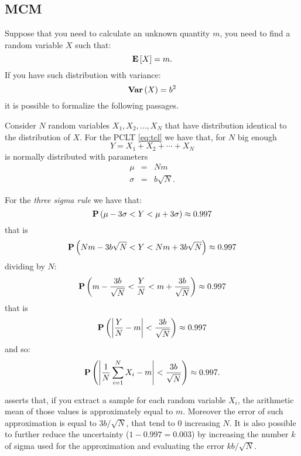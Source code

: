 \documentclass[dissertation.tex]{subfiles}
\begin{document}
\subsection{\acf{MCM}}
Suppose that you need to calculate an unknown quantity $m$, you need
to find a random variable $X$ such that:
\begin{equation*}
  \mathrm{\textbf{E}}\left[X\right] = m.
\end{equation*}
If you have such distribution with variance:
\begin{equation*}
  \mathrm{\textbf{Var}}\left(X\right) = b^2
\end{equation*}
it is possible to formalize the following passages.

Consider $N$ random variables $X_1,X_2,\dots,X_N$ that have
distribution identical to the distribution of $X$. For the \ac{PCLT}
\cref{eq:tcl} we have that, for $N$ big enough
\begin{equation*}
  Y=X_1+X_2+\cdots+X_N
\end{equation*}
is normally distributed with parameters
\begin{eqnarray*}
  \mu &=& Nm\\
  \sigma&=&b\sqrt{N}.
\end{eqnarray*}

For the \emph{three sigma rule} we have that:
\begin{equation*}
  \mathrm{\textbf{P}}\left(\mu-3\sigma < Y <\mu +3\sigma\right)\approx 0.997
\end{equation*}
that is
\begin{equation*}
  \mathrm{\textbf{P}}\left(Nm-3b\sqrt{N} < Y < Nm+3b\sqrt{N}\right)\approx 0.997
\end{equation*}
dividing by $N$:
\begin{equation*}
  \mathrm{\textbf{P}}\left(m-\frac{3b}{\sqrt{N}} < \frac{Y}{N} <
    m+\frac{3b}{\sqrt{N}}\right)\approx 0.997
\end{equation*}
that is
\begin{equation*}
  \mathrm{\textbf{P}}\left(\left|\frac{Y}{N}-m\right| <\frac{3b}{\sqrt{N}}\right)\approx 0.997
\end{equation*}
and so:
\begin{equation}\label{eq:mc}
  \mathrm{\textbf{P}}\left(\left|\frac{1}{N}\sum_{i=1}^NX_i-m\right| <\frac{3b}{\sqrt{N}}\right)\approx 0.997.
\end{equation}

 asserts that, if you extract a sample for each random
variable $X_i$, the arithmetic mean of those values is approximately
equal to $m$. Moreover the error of such approximation is equal to
$3b/\sqrt{N}$, that tend to $0$ increasing $N$. It is also possible to
further 
reduce the uncertainty ($1-0.997=0.003$) by increasing the number $k$ of
sigma used for the
approximation and evaluating the error $kb/\sqrt{N}$.
\end{document}
